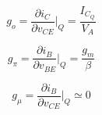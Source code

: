 \begin{equation}
    g_o = \frac{\partial i_C}{\partial v_{CE}} \Bigg|_Q = \frac{I_{C_Q}}{V_A}
\end{equation}

\begin{equation}
    g_{\pi} = \frac{\partial i_B}{\partial v_{BE}} \Bigg|_Q = \frac{g_m}{\beta}
\end{equation}

\begin{equation}
    g_{\mu} = \frac{\partial i_B}{\partial v_{CE}} \Bigg|_Q \simeq 0
\end{equation}



















